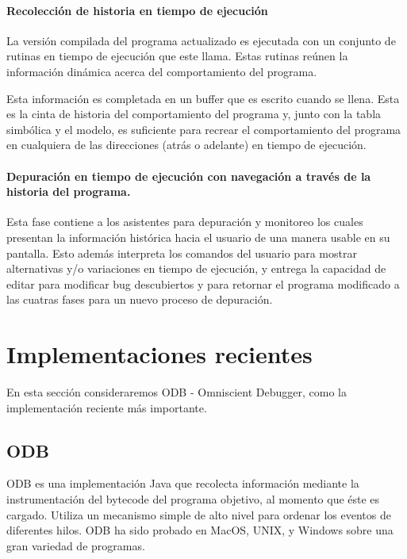 \documentclass[12pt,legalpaper]{report}
\begin{document}
				\paragraph[Recolección de historia]{Recolección de historia en tiempo de ejecución}

La versión compilada del programa actualizado es ejecutada con un conjunto de rutinas en tiempo de ejecución que este llama.  Estas rutinas reúnen la información dinámica acerca del comportamiento del programa.

Esta información es completada en un buffer que es escrito cuando se llena.  Esta es la cinta de historia del comportamiento del programa y, junto con la tabla simbólica y el modelo, es suficiente para recrear el comportamiento del programa en cualquiera de las direcciones (atrás o adelante) en tiempo de ejecución.

				\paragraph[Historia del programa]{Depuración en tiempo de ejecución con navegación a través de la historia del programa.}

Esta fase contiene a los asistentes para depuración y monitoreo los cuales presentan la información histórica hacia el usuario de una manera usable en su pantalla.  Esto además interpreta los comandos del usuario para mostrar alternativas y/o variaciones en tiempo de ejecución, y entrega la capacidad de editar para modificar bug descubiertos y para retornar el programa modificado a las cuatras fases para un nuevo proceso de depuración.


	\section{Implementaciones recientes}

En esta sección consideraremos ODB - Omniscient Debugger, como la implementación reciente más importante.

		\subsection{ODB}

ODB es una implementación Java que recolecta información mediante la instrumentación del bytecode del programa objetivo, al momento que éste es cargado.  Utiliza un mecanismo simple de alto nivel para ordenar los eventos de diferentes hilos.  ODB ha sido probado en MacOS, UNIX, y Windows sobre una gran variedad de programas.
\end{document}

